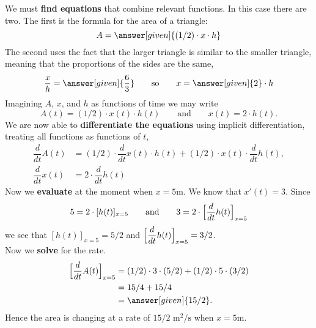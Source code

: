 \documentclass{ximera}
\begin{document}
\begin{example}
\begin{explanation}
    We must \textbf{find equations} that combine relevant
    functions. In this case there are two. The first is the formula
    for the area of a triangle:
    \[
    A = \answer[given]{(1/2) \cdot x \cdot h}
    \]
    The second uses the fact that the larger triangle is similar to
    the smaller triangle, meaning that the proportions of the sides
    are the same,
    \[
    \frac{x}{h} = \answer[given]{\frac{6}{3}}\qquad\text{so}\qquad x =
    \answer[given]{2}\cdot h
    \]
    Imagining $A$, $x$, and $h$ as functions of time we may write
    \[
    A(t) = (1/2) \cdot x(t) \cdot h(t) \qquad\text{and}\qquad x(t) =
    2\cdot h(t).
    \]
    We are now able to \textbf{differentiate the equations} using
    implicit differentiation, treating all functions as functions of
    $t$,
    \begin{align*}
    \dfrac{d}{dt}A(t) &= (1/2) \cdot\dfrac{d}{dt}x(t) \cdot h(t) +  (1/2) \cdot x(t) \cdot \dfrac{d}{dt}h(t),\\
     \dfrac{d}{dt}x(t) &= 2\cdot\dfrac{d}{dt}h(t)
    \end{align*}
    Now we \textbf{evaluate} at the moment when $x=5$m.
   We know that $x'(t) = 3$. Since
    \[
    5 = 2\cdot [h(t)]_{x=5}\qquad\text{and}\qquad 3= 2\cdot \Bigl[\dfrac{d}{dt}h(t)\Bigr]_{x=5}
    \]
    we see that $ [h(t)]_{x=5} = 5/2$ and $ \Bigl[\dfrac{d}{dt}h(t)\Bigr]_{x=5} = 3/2$. \\
    Now we \textbf{solve} for the rate.
    \begin{align*}
    \Bigl[\dfrac{d}{dt}A(t)\Bigr]_{x=5}  &= (1/2) \cdot 3 \cdot (5/2) + (1/2) \cdot 5 \cdot (3/2)\\
      &= 15/4 + 15/4\\
      &= \answer[given]{15/2}.
    \end{align*}
    Hence the area is changing at a rate of $15/2$ $\text{m}^2/\text{s}$ when $x=5$m.
    
  \end{explanation}
\end{example}
\end{document}

